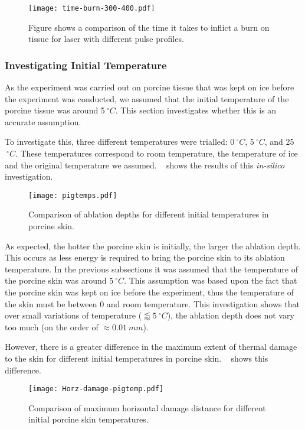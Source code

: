 \begin{figure}[!htbp]
	\centering
	\texttt{[image: time-burn-300-400.pdf]}
	\caption{Figure shows a comparison of the time it takes to inflict a burn on tissue for laser with different pulse profiles.}
	\label{fig:pulsetypeburn}
\end{figure}
\FloatBarrier
\subsubsection*{Investigating Initial Temperature}

As the experiment was carried out on porcine tissue that was kept on ice before the experiment was conducted, we assumed that the initial temperature of the porcine tissue was around 5$~^{\circ}C$.
This section investigates whether this is an accurate assumption.

To investigate this, three different temperatures were trialled: 0$~^{\circ}C$, 5$~^{\circ}C$, and 25$~^{\circ}C$.
These temperatures correspond to room temperature, the temperature of ice and the original temperature we assumed.
~ shows the results of this \textit{in-silico} investigation.


\begin{figure}[!htbp]
	\centering
	\texttt{[image: pigtemps.pdf]}
	\caption{Comparison of ablation depths for different initial temperatures in porcine skin.}
	\label{fig:pigtempcomp}
\end{figure}

As expected, the hotter the porcine skin is initially, the larger the ablation depth.
This occurs as less energy is required to bring the porcine skin to its ablation temperature.
In the previous subsections it was assumed that the temperature of the porcine skin was around $5~^{\circ}C$.
This assumption was based upon the fact that the porcine skin was kept on ice before the experiment, thus the temperature of the skin must be between 0 and room temperature.
This investigation shows that over small variations of temperature ($\lessapprox 5~^{\circ}C$), the ablation depth does not vary too much (on the order of $\approx 0.01~mm$).

However, there is a greater difference in the maximum extent of thermal damage to the skin for different initial temperatures in porcine skin.
~ shows this difference.


\begin{figure}[!htbp]
	\centering
	\texttt{[image: Horz-damage-pigtemp.pdf]}
	\caption{Comparison of maximum horizontal damage distance for different initial porcine skin temperatures.}
	\label{fig:horzdamagepig}
\end{figure}


